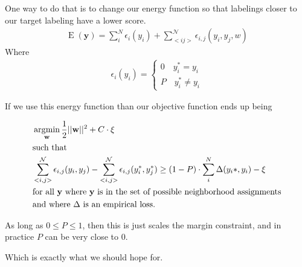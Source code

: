 One way to do that is to change our energy function so that labelings 
closer to our target labeling have a lower score.
%
\begin{align}
\operatorname{E}(\mathbf{y}) = \sum_i^N\epsilon_i(y_i) + \sum_{<i
  j>}^{\mathcal{N}}\epsilon_{i,j}(y_i,y_j,w)
\end{align}
%
Where  
%
\begin{align}
\epsilon_i(y_i) = \begin{cases}
  0 \quad y_i^* = y_i \\
  P \quad y_i^* \neq y_i
\end{cases}
\end{align}

If we use this energy function than our objective function ends up being 

\begin{align*}
&\operatorname*{\arg\!\min}_{\mathbf{w}} \frac{1}{2}||\mathbf{w}||^2 +
  C\cdot\xi\\
&\text{such that} \\
&\sum_{<i,j>}^{\mathcal{N}}\epsilon_{i,j}(y_i,y_j)
   - \sum_{<i,j>}^{\mathcal{N}}\epsilon_{i,j}(y_i^*,y_j^*)  \geq (1-P)\cdot\sum_i^N\Delta(y_i*, y_i) - \xi\\ 
&\text{for all } \mathbf{y} \text{ where } \mathbf{y} \text{ is in the set of
  possible neighborhood assignments}\\
&\text{and where } \Delta \text{ is an empirical loss.}\\
\end{align*}

As long as $0 \leq P \leq 1$, then this is just scales the margin
constraint, and in practice $P$ can be very close to 0.

Which is exactly what we should hope for.

